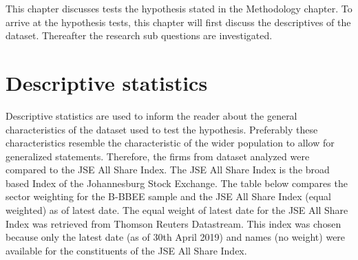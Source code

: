 This chapter discusses tests the hypothesis stated in the Methodology chapter. To arrive at the hypothesis tests, this chapter will first discuss the descriptives of the dataset. Thereafter the research sub questions are investigated.
\section{Descriptive statistics}
Descriptive statistics are used to inform the reader about the general characteristics of the dataset used to test the hypothesis. Preferably these characteristics resemble the characteristic of the wider population to allow for generalized statements. Therefore, the firms from dataset analyzed were compared to the JSE All Share Index. The JSE All Share Index is the broad based Index of the Johannesburg Stock Exchange. The table below compares the sector weighting for the B-BBEE sample and the JSE All Share Index (equal weighted) as of latest date. The equal weight of latest date for the JSE All Share Index was retrieved from Thomson Reuters Datastream. This index was chosen because only the latest date (as of 30th April 2019) and names (no weight) were available for the constituents of the JSE All Share Index.
